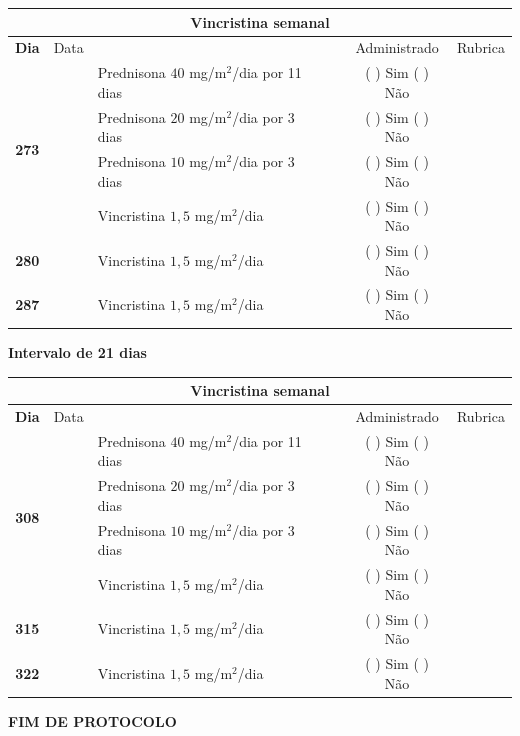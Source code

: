 \documentclass[11pt,a4paper,oldfontcommands]{memoir}
\begin{document}
\begin{center}
\begin{table}[H] \small
\begin{tabular}{p{1cm}c|p{5cm}|p{1cm}p{2cm}|c|c}
	\hline
	\multicolumn{7}{c}{Vincristina semanal} \\
	\hline
	\multicolumn{1}{c|}{\multirow{1}{*}{\textbf{Dia}}}&{Data}&{}&{}&&{Administrado}&{Rubrica} \\
    \hline
    \multicolumn{1}{c|}{\multirow{4}{*}{\textbf{273}}}&&{Prednisona \(40\) mg/m\(^2\)/dia por 11 dias}&\multicolumn{1}{c}{}&&{(  ) Sim (  ) Não}&\\
    \multicolumn{1}{c|}{}&&{Prednisona \(20\) mg/m\(^2\)/dia por 3 dias}&\multicolumn{1}{c}{}&&{(  ) Sim (  ) Não}&\\
    \multicolumn{1}{c|}{}&&{Prednisona \(10\) mg/m\(^2\)/dia por 3 dias}&\multicolumn{1}{c}{}&&{(  ) Sim (  ) Não}&\\
    \multicolumn{1}{c|}{\textbf{}}&&{Vincristina \(1,5\) mg/m\(^2\)/dia}&\multicolumn{1}{c}{}&&{(  ) Sim (  ) Não}&\\
    \cline{1-6}
    \multicolumn{1}{c|}{\textbf{280}}&&{Vincristina \(1,5\) mg/m\(^2\)/dia}&\multicolumn{1}{c}{}&&{(  ) Sim (  ) Não}&\\
    \cline{1-3}\cline{6-6}
    \multicolumn{1}{c|}{\textbf{287}}&&{Vincristina \(1,5\) mg/m\(^2\)/dia}&\multicolumn{1}{c}{}&&{(  ) Sim (  ) Não}&\\
    \hline
\end{tabular}
\end{table}
\textbf{Intervalo de 21 dias}
\begin{table}[H] \small
\begin{tabular}{p{1cm}c|p{5cm}|p{1cm}p{2cm}|c|c}
	\hline
	\multicolumn{7}{c}{Vincristina semanal} \\
	\hline
	\multicolumn{1}{c|}{\multirow{1}{*}{\textbf{Dia}}}&{Data}&{}&{}&&{Administrado}&{Rubrica} \\
    \hline
    \multicolumn{1}{c|}{\multirow{4}{*}{\textbf{308}}}&&{Prednisona \(40\) mg/m\(^2\)/dia por 11 dias}&\multicolumn{1}{c}{}&&{(  ) Sim (  ) Não}&\\
    \multicolumn{1}{c|}{}&&{Prednisona \(20\) mg/m\(^2\)/dia por 3 dias}&\multicolumn{1}{c}{}&&{(  ) Sim (  ) Não}&\\
    \multicolumn{1}{c|}{}&&{Prednisona \(10\) mg/m\(^2\)/dia por 3 dias}&\multicolumn{1}{c}{}&&{(  ) Sim (  ) Não}&\\
    \multicolumn{1}{c|}{\textbf{}}&&{Vincristina \(1,5\) mg/m\(^2\)/dia}&\multicolumn{1}{c}{}&&{(  ) Sim (  ) Não}&\\
    \cline{1-6}
    \multicolumn{1}{c|}{\textbf{315}}&&{Vincristina \(1,5\) mg/m\(^2\)/dia}&\multicolumn{1}{c}{}&&{(  ) Sim (  ) Não}&\\
    \cline{1-3}\cline{6-6}
    \multicolumn{1}{c|}{\textbf{322}}&&{Vincristina \(1,5\) mg/m\(^2\)/dia}&\multicolumn{1}{c}{}&&{(  ) Sim (  ) Não}&\\
    \hline
\end{tabular}
\end{table}

\textbf{FIM DE PROTOCOLO}

\end{center}
\end{document}

